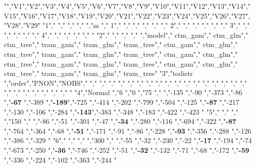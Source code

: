 "","V1","V2","V3","V4","V5","V6","V7","V8","V9","V10","V11","V12","V13","V14","V15","V16","V17","V18","V19","V20","V21","V22","V23","V24","V25","V26","V27","V28","V29"
"1","        ","     ","    ","    ","m    ","             1","              ","              ","              ","              ","              ","             2","              ","              ","              ","              ","              ","             3","              ","              ","              ","              ","              ","             4","              ","              ","              ","              ","              "
"2","        ","     ","    ","    ","model","       ctm_gam","       ctm_glm","      ctm_tree","      tram_gam","      tram_glm","     tram_tree","       ctm_gam","       ctm_glm","      ctm_tree","      tram_gam","      tram_glm","     tram_tree","       ctm_gam","       ctm_glm","      ctm_tree","      tram_gam","      tram_glm","     tram_tree","       ctm_gam","       ctm_glm","      ctm_tree","      tram_gam","      tram_glm","     tram_tree"
"3","todistr ","order","PNON","NOBS","     ","              ","              ","              ","              ","              ","              ","              ","              ","              ","              ","              ","              ","              ","              ","              ","              ","              ","              ","              ","              ","              ","              ","              ","              "
"4","Normal  ","6    ","0   ","75  ","     ","-135          ","-90           ","-373          ","-86           ","\textbf{-67} ","-389          ","\textbf{-189}","-725          ","-414          ","-202          ","-799          ","-504          ","-125          ","\textbf{-87} ","-217          ","-130          ","-106          ","-284          ","\textbf{-143}","-383          ","-348          ","-183          ","-422          ","-423          "
"5","        ","     ","    ","150 ","     ","-86           ","-51           ","-301          ","-47           ","\textbf{-34} ","-280          ","-116          ","-694          ","-322          ","\textbf{-87} ","-764          ","-364          ","-68           ","\textbf{-51} ","-171          ","-91           ","-86           ","-228          ","\textbf{-93} ","-356          ","-288          ","-126          ","-386          ","-329          "
"6","        ","     ","    ","300 ","     ","-55           ","-32           ","-230          ","-22           ","\textbf{-17} ","-194          ","-74           ","-673          ","-250          ","\textbf{-36} ","-746          ","-252          ","-51           ","\textbf{-32} ","-132          ","-71           ","-68           ","-172          ","\textbf{-59} ","-336          ","-224          ","-102          ","-363          ","-244          "
